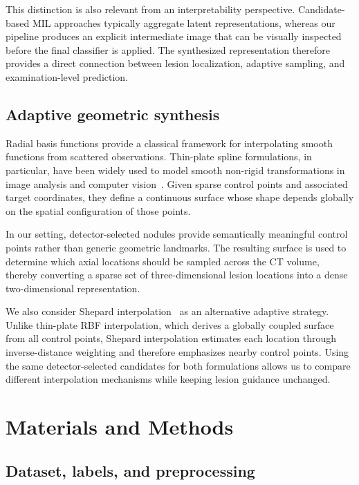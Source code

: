 \documentclass[preprint,12pt]{elsarticle}
\begin{document}
This distinction is also relevant from an interpretability perspective. Candidate-based MIL approaches typically aggregate latent representations, whereas our pipeline produces an explicit intermediate image that can be visually inspected before the final classifier is applied. The synthesized representation therefore provides a direct connection between lesion localization, adaptive sampling, and examination-level prediction.

\subsection{Adaptive geometric synthesis}

Radial basis functions provide a classical framework for interpolating smooth functions from scattered observations. Thin-plate spline formulations, in particular, have been widely used to model smooth non-rigid transformations in image analysis and computer vision~\cite{bookstein1989principal,cantone2025deep}. Given sparse control points and associated target coordinates, they define a continuous surface whose shape depends globally on the spatial configuration of those points.

In our setting, detector-selected nodules provide semantically meaningful control points rather than generic geometric landmarks. The resulting surface is used to determine which axial locations should be sampled across the CT volume, thereby converting a sparse set of three-dimensional lesion locations into a dense two-dimensional representation.

We also consider Shepard interpolation~\cite{shepard1968} as an alternative adaptive strategy. Unlike thin-plate RBF interpolation, which derives a globally coupled surface from all control points, Shepard interpolation estimates each location through inverse-distance weighting and therefore emphasizes nearby control points. Using the same detector-selected candidates for both formulations allows us to compare different interpolation mechanisms while keeping lesion guidance unchanged.

\section{Materials and Methods}

\subsection{Dataset, labels, and preprocessing}
\end{document}
